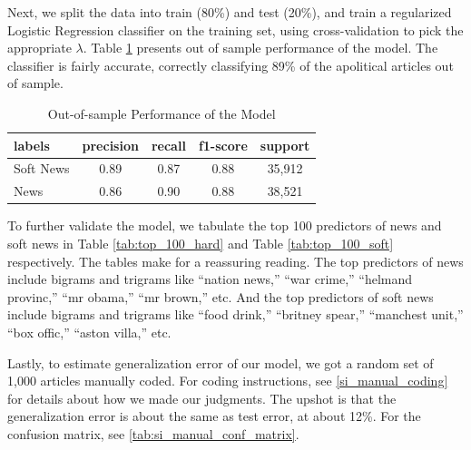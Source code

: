 \documentclass[12pt, letterpaper]{article}
\begin{document}
Next, we split the data into train (80\%) and test (20\%), and train a regularized Logistic Regression classifier \citep{zou2005regularization} on the training set, using cross-validation to pick the appropriate $\lambda$. Table \ref{tab:url_conf_matrix} presents out of sample performance of the model. The classifier is fairly accurate, correctly classifying 89\% of the apolitical articles out of sample.

\begin{table}[!htb]
\centering
\caption{Out-of-sample Performance of the Model} 
\label{tab:url_conf_matrix}
\begin{tabular}{lcccc}
\hline
labels & precision   &  recall  &   f1-score  &   support \\
\hline
Soft News      & 0.89    &   0.87    &   0.88   &    35,912 \\
News          & 0.86    &   0.90    &   0.88   &    38,521 \\
\hline
\end{tabular}
\end{table}

To further validate the model, we tabulate the top 100 predictors of news and soft news in Table \ref{tab:top_100_hard} and Table \ref{tab:top_100_soft} respectively. The tables make for a reassuring reading. The top predictors of news include bigrams and trigrams like ``nation news,'' ``war crime,'' ``helmand provinc,'' ``mr obama,'' ``mr brown,'' etc. And the top predictors of soft news include bigrams and trigrams like ``food drink,'' ``britney spear,'' ``manchest unit,'' ``box offic,'' ``aston villa,'' etc.  

\singlespacing



\clearpage


\doublespacing
Lastly, to estimate generalization error of our model, we got a random set of 1,000 articles manually coded. For coding instructions, see \ref{si_manual_coding} for details about how we made our judgments. The upshot is that the generalization error is about the same as test error, at about 12\%. For the confusion matrix, see \ref{tab:si_manual_conf_matrix}.
\end{document}
